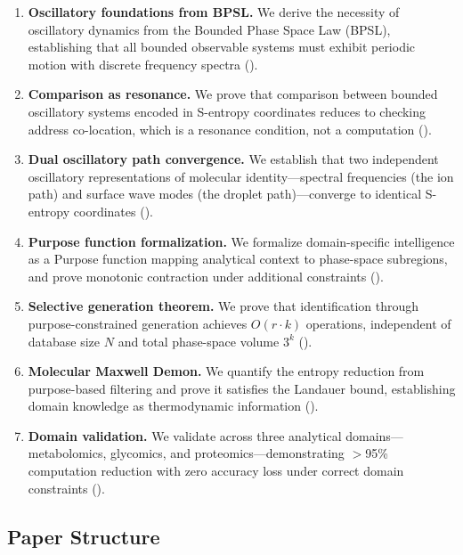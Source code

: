\documentclass[11pt,twocolumn,a4paper]{article}
\theoremstyle{definition}
\theoremstyle{remark}
\begin{document}
\begin{enumerate}[label=(\roman*)]
  \item \textbf{Oscillatory foundations from BPSL.} We derive the necessity of oscillatory dynamics from the Bounded Phase Space Law (BPSL), establishing that all bounded observable systems must exhibit periodic motion with discrete frequency spectra ().

  \item \textbf{Comparison as resonance.} We prove that comparison between bounded oscillatory systems encoded in S-entropy coordinates reduces to checking address co-location, which is a resonance condition, not a computation ().

  \item \textbf{Dual oscillatory path convergence.} We establish that two independent oscillatory representations of molecular identity---spectral frequencies (the ion path) and surface wave modes (the droplet path)---converge to identical S-entropy coordinates ().

  \item \textbf{Purpose function formalization.} We formalize domain-specific intelligence as a Purpose function mapping analytical context to phase-space subregions, and prove monotonic contraction under additional constraints ().

  \item \textbf{Selective generation theorem.} We prove that identification through purpose-constrained generation achieves $O(r \cdot k)$ operations, independent of database size $N$ and total phase-space volume $3^k$ ().

  \item \textbf{Molecular Maxwell Demon.} We quantify the entropy reduction from purpose-based filtering and prove it satisfies the Landauer bound, establishing domain knowledge as thermodynamic information ().

  \item \textbf{Domain validation.} We validate across three analytical domains---metabolomics, glycomics, and proteomics---demonstrating $>$95\% computation reduction with zero accuracy loss under correct domain constraints ().
\end{enumerate}

\subsection{Paper Structure}\label{sec:structure}
\end{document}
